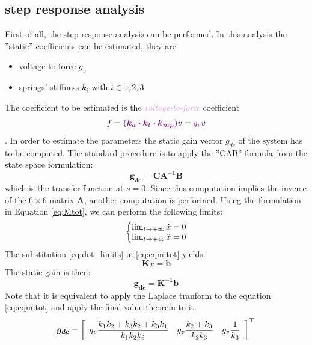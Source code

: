 \documentclass[twosided,a4paper]{article}           %
\makeatletter
\newcommand{\tr}{^{\tiny{\bm \top}}}
\newenvironment{sistema}%
{\left\lbrace\begin{array}{@{}l@{}}}%
	{\end{array}\right.}
\makeatother
\begin{document}
\subsection{step response analysis}
First of all, the step response analysis can be performed. In this analysis the ''static'' coefficients can be estimated, they are:
\begin{itemize}
	\item voltage to force $g_v$
	\item springs' stiffness $k_i$ with $i \in 1,2,3$
\end{itemize} 
The coefficient to be estimated is the \textcolor{Plum}{\textit{voltage-to-force}} coefficient %
\begin{equation}
	f = \textcolor{Plum}{\bm{(k_a\cdot k_t \cdot k_{mp})}}v = \textcolor{Plum}{g_v} v
\end{equation}.
In order to estimate the parameters the static gain vector $g_{dc}$ of the system has to be computed. The standard procedure is to apply the ''CAB'' formula from the state space formulation:
\begin{equation}
	\bm{g_{dc}} =	\bm{CA^{-1}B}
\end{equation}
which is the transfer function at $s = 0$. Since this computation implies the inverse of the $6 \times 6$ matrix $\bm A$, another computation is performed. Using the formulation in Equation \ref{eq:Mtot}, we can perform the following limits:
\begin{equation}
	\begin{sistema}
	\lim_{t \to + \infty}{\dot{x}}  = 0  \\
	\lim_{t \to + \infty}{\ddot{x}} = 0
	\end{sistema}
	\label{eq:dot_limits}
\end{equation}
The substitution \ref{eq:dot_limits} in \ref{eq:eqm:tot} yields:
\begin{equation}
\bm K x = \bm b
\label{eq:dot0}
\end{equation} The static gain is then:
\begin{equation}
	\bm{g_{dc}} = \bm{K^{-1}}\bm{b}
\end{equation}
Note that it is equivalent to apply the Laplace tranform to the equation \ref{eq:eqm:tot} and apply the final value theorem to it.
\begin{equation}
	\bm{g_{dc}} =
	\left [ \begin{array}{ccc}
	g_v\dfrac{k_1k_2 + k_3k_2 + k_3k_1}{k_1k_2k_3}  & g_v\dfrac{k_2+k_3}{k_2k_3} & g_v\dfrac{1}{k_3}
	\end{array} \right ]\tr
	\label{eq:g_dc}
\end{equation}
\end{document}
